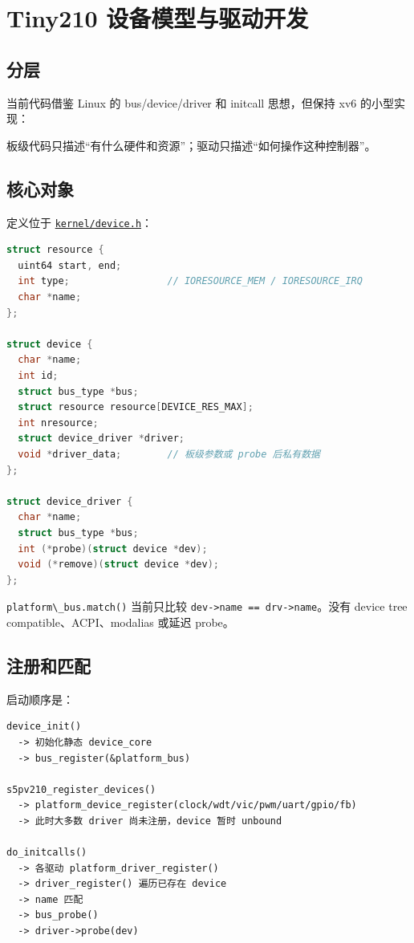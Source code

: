 \chapter{Tiny210
设备模型与驱动开发}\label{tiny210-ux8bbeux5907ux6a21ux578bux4e0eux9a71ux52a8ux5f00ux53d1}

\section{分层}\label{ux5206ux5c42}

当前代码借鉴 Linux 的 bus/device/driver 和 initcall 思想，但保持 xv6
的小型实现：



板级代码只描述``有什么硬件和资源''；驱动只描述``如何操作这种控制器''。

\section{核心对象}\label{ux6838ux5fc3ux5bf9ux8c61}

定义位于
\href{../../../kernel/device.h}{\passthrough{\lstinline!kernel/device.h!}}：

\begin{lstlisting}[language=C]
struct resource {
  uint64 start, end;
  int type;                 // IORESOURCE_MEM / IORESOURCE_IRQ
  char *name;
};

struct device {
  char *name;
  int id;
  struct bus_type *bus;
  struct resource resource[DEVICE_RES_MAX];
  int nresource;
  struct device_driver *driver;
  void *driver_data;        // 板级参数或 probe 后私有数据
};

struct device_driver {
  char *name;
  struct bus_type *bus;
  int (*probe)(struct device *dev);
  void (*remove)(struct device *dev);
};
\end{lstlisting}

\passthrough{\lstinline!platform\_bus.match()!} 当前只比较
\passthrough{\lstinline!dev->name == drv->name!}。没有 device tree
compatible、ACPI、modalias 或延迟 probe。

\section{注册和匹配}\label{ux6ce8ux518cux548cux5339ux914d}

启动顺序是：

\begin{lstlisting}
device_init()
  -> 初始化静态 device_core
  -> bus_register(&platform_bus)

s5pv210_register_devices()
  -> platform_device_register(clock/wdt/vic/pwm/uart/gpio/fb)
  -> 此时大多数 driver 尚未注册，device 暂时 unbound

do_initcalls()
  -> 各驱动 platform_driver_register()
  -> driver_register() 遍历已存在 device
  -> name 匹配
  -> bus_probe()
  -> driver->probe(dev)
\end{lstlisting}

